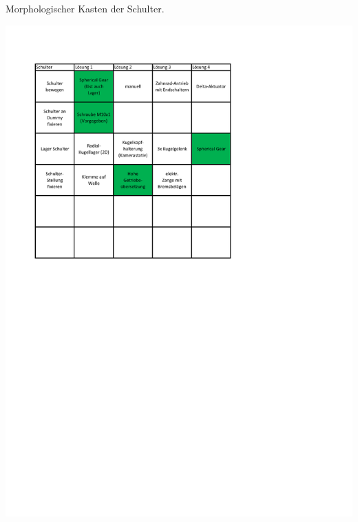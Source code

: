 	\begin{table}[h]
		\caption[Morphologischer Kasten der Schulter]{Morphologischer Kasten der Schulter.}
		\centering
		\includegraphics[width=\textwidth]{Abb/Morphologischer_Kasten_Schulter}
		\label{fig:morphologische-kasten-schulter}
	\end{table}
%
